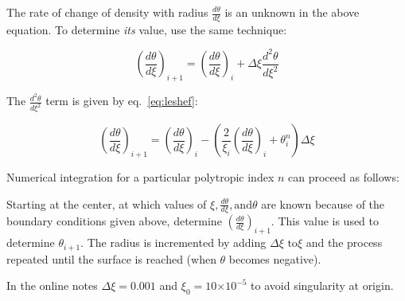 \documentclass{article}
\providecommand{\e}[1]{\ensuremath{\times 10^{#1}}}
\begin{document}
    The rate of change of density with radius \(\frac{d\theta}{d\xi}\) is an
    unknown in the above equation. To determine \emph{its} value, use the same
    technique:

    \begin{equation}
        \left(\frac{d\theta}{d\xi}\right)_{i+1}=\left(\frac{d\theta}{d\xi}\right)_{i} +
        \Delta\xi\frac{d^2\theta}{d\xi^2}
    \end{equation}
    
    The \(\frac{d^2\theta}{d\xi^2}\) term is given by eq.~\ref{eq:leshef}:

    \begin{equation}
        \left(\frac{d\theta}{d\xi}\right)_{i+1} =
        \left(\frac{d\theta}{d\xi}\right)_i-\left(\frac{2}{\xi_i}\left(\frac{d\theta}{d\xi}\right)_i+\theta_i^n\right)\Delta\xi
    \end{equation}

    Numerical integration for a particular polytropic index \(n\) can proceed as
    follows:

    Starting at the center, at which values of \(\xi,\frac{d\theta}{d\xi},\text{
    and}\theta\) are known because of the boundary conditions given above,
    determine \(\left(\frac{d\theta}{d\xi}\right)_{i+1}\). This value is used to determine
    \(\theta_{i+1}\). The radius is incremented by adding \(\Delta\xi\text{ to}
    \xi\) and the process repeated until the surface is reached (when \(\theta\)
    becomes negative).

    In the online notes
    \(\Delta\xi=0.001\) and \(\xi_0=10\e{-5}\) to avoid singularity
    at origin.
        
\end{document}
